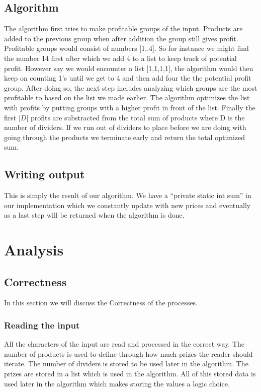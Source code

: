 \documentclass{article}
\begin{document}
\subsection{Algorithm}
The algorithm first tries to make profitable groups of the input. Products are added to the previous group when after addition the group still gives profit. Profitable groups would consist of numbers [1..4]. So for instance we might find the number 14 first after which we add 4 to a list to keep track of potential profit. However say we would encounter a list [1,1,1,1], the algorithm would then keep on counting 1's until we get to 4 and then add four the the potential profit group.
\newline
\newline
After doing so, the next step includes analyzing which groups are the most profitable to based on the list we made earlier. The algorithm optimizes the list with profits by putting groups with a higher profit in front of the list.
\newline
\newline
Finally the first $|D|$ profits are substracted from the total sum of products where D is the number of dividers. If we run out of dividers to place before we are doing with going through the products we terminate early and return the total optimized sum.

\subsection{Writing output}
This is simply the result of our algorithm. We have a ``private static int sum'' in our implementation which we constantly update with new prices and eventually as a last step will be returned when the algorithm is done.

\newpage
\section{Analysis}

\subsection{Correctness}
In this section we will discuss the Correctness of the processes.

\subsubsection{Reading the input}
All the characters of the input are read and processed in the correct way. The number of products is used to define through how much prizes the reader should iterate. The number of dividers is stored to be used later in the algorithm. The prizes are stored in a list which is used in the algorithm. All of this stored data is used later in the algorithm which makes storing the values a logic choice.
\end{document}
